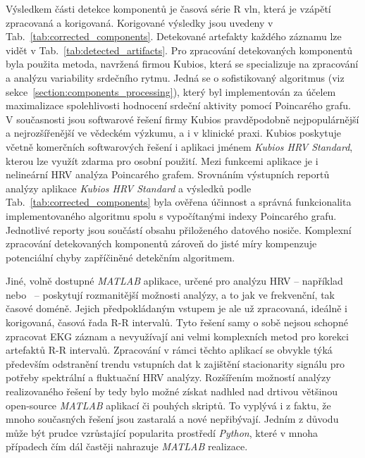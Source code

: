 Výsledkem části detekce komponentů je časová série R vln, která je vzápětí
zpracovaná a korigovaná. Korigované výsledky jsou uvedeny v
Tab.~\ref{tab:corrected_components}. Detekované artefakty každého záznamu lze
vidět v Tab.~\ref{tab:detected_artifacts}. Pro zpracování detekovaných
komponentů byla použita metoda, navržená firmou Kubios, která se specializuje na
zpracování a analýzu variability srdečního rytmu. Jedná se o sofistikovaný
algoritmus (viz sekce~\ref{section:components_processing}), který byl
implementován za účelem maximalizace spolehlivosti hodnocení srdeční aktivity
pomocí Poincarého grafu. V současnosti jsou softwarové řešení firmy Kubios
pravděpodobně nejpopulárnější a nejrozšířenější ve vědeckém výzkumu, a i v
klinické praxi. Kubios poskytuje včetně komerčních softwarových řešení i
aplikaci jménem \textit{Kubios HRV Standard}, kterou lze využít zdarma pro
osobní použití. Mezi funkcemi aplikace je i nelineární HRV analýza Poincarého
grafem. Srovnáním výstupních reportů analýzy aplikace \textit{Kubios HRV
Standard} a výsledků podle Tab.~\ref{tab:corrected_components} byla ověřena
účinnost a správná funkcionalita implementovaného algoritmu spolu s vypočítanými
indexy Poincarého grafu. Jednotlivé reporty jsou součástí obsahu přiloženého
datového nosiče. Komplexní zpracování detekovaných komponentů zároveň do jisté
míry kompenzuje potenciální chyby zapříčiněné detekčním algoritmem. 

Jiné, volně dostupné \textit{MATLAB} aplikace, určené pro analýzu HRV --
například \cite{Ramshur2010} nebo~\cite{Kardia2010} -- poskytují rozmanitější
možnosti analýzy, a to jak ve frekvenční, tak časové doméně. Jejich
předpokládaným vstupem je ale už zpracovaná, ideálně i korigovaná, časová řada
R-R intervalů. Tyto řešení samy o sobě nejsou schopné zpracovat EKG záznam a
nevyužívají ani velmi komplexních metod pro korekci artefaktů R-R intervalů.
Zpracování v rámci těchto aplikací se obvykle týká především odstranění trendu
vstupních dat k zajištění stacionarity signálu pro potřeby spektrální a
fluktuační HRV analýzy. Rozšířením možností analýzy realizovaného řešení by tedy
bylo možné získat nadhled nad drtivou většinou open-source \textit{MATLAB}
aplikací či pouhých skriptů. To vyplývá i z faktu, že mnoho současných řešení
jsou zastaralá a nové nepřibývají. Jedním z důvodu může být prudce vzrůstající
popularita prostředí \textit{Python}, které v mnoha případech čím dál častěji
nahrazuje \textit{MATLAB} realizace. 

